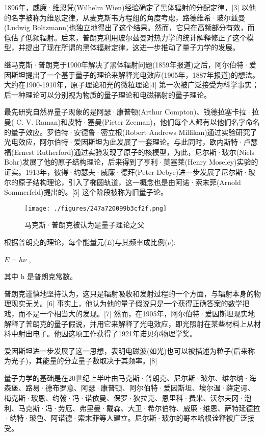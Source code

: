 1896年，威廉·维恩凭(Wilhelm Wien)经验确定了黑体辐射的分配定律，[3] 以他的名字被称为维恩定律，从麦克斯韦方程组的角度考虑，路德维希·玻尔兹曼(Ludwig Boltzmann)也独立地得出了这个结果。然而，它只在高频部分有效，而低估了低频辐射。后来，普朗克利用玻尔兹曼对热力学的统计解释修正了这个模型，并提出了现在所谓的黑体辐射定律，这进一步推动了量子力学的发展。

继马克斯·普朗克于1900年解决了黑体辐射问题(1859年报道)之后，阿尔伯特·爱因斯坦提出了一个基于量子的理论来解释光电效应(1905年，1887年报道)的想法。 大约在1900-1910年，原子理论和光的微粒理论[4] 第一次被广泛接受为科学事实；后一种理论可以分别视为物质的量子理论和电磁辐射的量子理论。

最先研究自然界量子现象的是阿瑟·康普顿(Arthur Compton)、钱德拉塞卡拉·拉曼( C. V. Raman)和皮特·塞曼(Pieter Zeeman)，他们每个人都有以他们名字命名的量子效应。罗伯特·安德鲁·密立根(Robert Andrews Millikan)通过实验研究了光电效应，阿尔伯特·爱因斯坦为此发展了一套理论。与此同时，欧内斯特·卢瑟福(Ernest Rutherford)通过实验发现了原子的核模型，为此，尼尔斯·玻尔(Niels Bohr)发展了他的原子结构理论，后来得到了亨利·莫塞莱(Henry Moseley)实验的证实。1913年，彼得·约瑟夫·威廉·德拜(Peter Debye)进一步发展了尼尔斯·玻尔的原子结构理论，引入了椭圆轨道，这一概念也是由阿诺·索末菲(Arnold Sommerfeld)提出的。[5] 这个阶段被称为旧量子论。

\begin{figure}[ht]
\centering
\texttt{[image: ./figures/247a720099b3cf2f.png]}
\caption{马克斯·普朗克被认为是量子理论之父} \label{fig_LZLX_1}
\end{figure}
根据普朗克的理论，每个能量元($E$)与其频率成比例($\nu$):

$E = h\nu$ ,

其中 h 是普朗克常数。

普朗克谨慎地坚持认为，这只是辐射吸收和发射过程的一个方面，与辐射本身的物理现实无关。[6] 事实上，他认为他的量子假说只是一个获得正确答案的数学把戏，而不是一个相当大的发现。[7] 然而，在1905年，阿尔伯特·爱因斯坦现实地解释了普朗克的量子假说，并用它来解释了光电效应，即光照射在某些材料上从材料中射出电子。他因这项工作获得了1921年诺贝尔物理学奖。

爱因斯坦进一步发展了这一思想，表明电磁波(如光)也可以被描述为粒子(后来称为光子)，其能量的分立量子数取决于其频率。[8]

量子力学的基础是在20世纪上半叶由马克斯·普朗克、尼尔斯·玻尔、维尔纳·海森堡、路易·德布罗意、阿瑟·康普顿、阿尔伯特·爱因斯坦、埃尔温·薛定谔、梅克斯·玻恩、约翰·冯·诺依曼、保罗·狄拉克、恩里科·费米、沃尔夫冈·泡利、马克斯·冯·劳厄、弗里曼·戴森、大卫·希尔伯特、威廉·维恩、萨特延德拉·纳特·玻色、阿诺德·索末菲等人建立。尼尔斯·玻尔的哥本哈根诠释被广泛接受。

